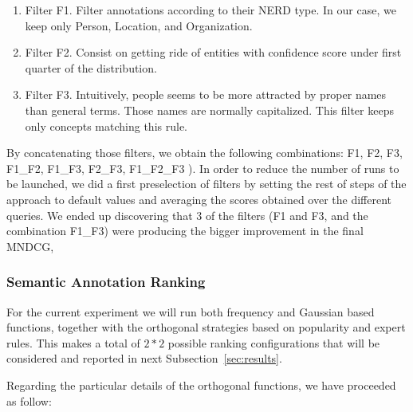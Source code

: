 \documentclass{llncs}
\begin{document}
\begin{enumerate}
\item Filter F1. Filter annotations according to their NERD type. In our case, we keep only Person, Location, and Organization.
\item Filter F2. Consist on getting ride of entities with confidence score under first quarter of the distribution.
\item Filter F3. Intuitively, people seems to be more attracted by proper names than general terms. Those names are normally capitalized. This filter keeps only concepts matching this rule.
\end{enumerate}

By concatenating those filters, we obtain the following combinations: F1,  F2,  F3,  F1\_F2,  F1\_F3, F2\_F3, F1\_F2\_F3 ). In order to reduce the number of runs to be launched, we did a first preselection of filters by setting the rest of steps of the approach to default values and averaging the scores obtained over the different queries. We ended up discovering that 3 of the filters (F1 and F3, and the combination F1\_F3) were producing the bigger improvement in the final MNDCG, 

\subsubsection{Semantic Annotation Ranking}
\label{sec:settingsAnnotationRanking}

For the current experiment we will run both frequency and Gaussian based functions, together with the orthogonal strategies based on popularity and expert rules. This makes a total of $2*2$ possible ranking configurations that will be considered and reported in next Subsection~\ref{sec:results}.

Regarding the particular details of the orthogonal functions, we have proceeded as follow:
\end{document}
